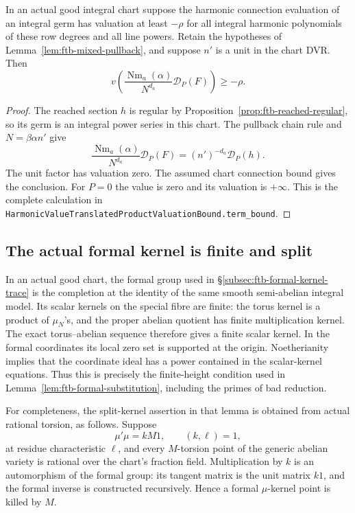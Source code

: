 \begin{srproposition}
\label{prop:ftb-mixed-value-bound}
In an actual good integral chart suppose the harmonic connection
evaluation of an integral germ has valuation at least \(-\rho\) for
all integral harmonic polynomials of these row degrees and all line
powers.
Retain the hypotheses of Lemma~\ref{lem:ftb-mixed-pullback}, and suppose
\(n'\) is a unit in the chart DVR.
Then
\[
 v\left(
  \frac{\operatorname{Nm}_a(\alpha)}{N^{d_a}}
                         \mathcal D_P(F)\right)\ge-\rho .
\]
\end{srproposition}
\begin{proof}
The reached section \(h\) is regular by
Proposition~\ref{prop:ftb-reached-regular}, so its germ is an integral
power series in this chart.
The pullback chain rule and \(N=\beta\alpha n'\) give
\[
 \frac{\operatorname{Nm}_a(\alpha)}{N^{d_a}}\mathcal D_P(F)
             =(n')^{-d_a}\mathcal D_P(h).
\]
The unit factor has valuation zero.
The assumed chart connection bound gives the conclusion.
For \(P=0\) the value is zero and its valuation is \(+\infty\).
This is the complete calculation in
\texttt{HarmonicValueTranslatedProductValuationBound.term\_bound}.
\end{proof}

\subsection{The actual formal kernel is finite and split}
\label{subsec:ftb-actual-split-kernel}

In an actual good chart, the formal group used in
\S\ref{subsec:ftb-formal-kernel-trace} is the completion at the identity
of the same smooth semi-abelian integral model.
Its scalar kernels on the special fibre are finite: the torus kernel
is a product of \(\mu_N\)'s, and the proper abelian quotient has finite
multiplication kernel.
The exact torus--abelian sequence therefore gives a finite scalar
kernel.  In the formal coordinates its local zero set is supported
at the origin.  Noetherianity implies that the coordinate ideal has a
power contained in the scalar-kernel equations.
Thus this is precisely the finite-height condition used in
Lemma~\ref{lem:ftb-formal-substitution}, including the primes of bad
reduction.

For completeness, the split-kernel assertion in that lemma is
obtained from actual rational torsion, as follows.
Suppose
\[
 \mu'\mu=kM1,\qquad (k,\ell)=1,
\]
at residue characteristic \(\ell\), and every \(M\)-torsion point of
the generic abelian variety is rational over the chart's fraction
field.
Multiplication by \(k\) is an automorphism of the formal group:
its tangent matrix is the unit matrix \(k1\), and the formal inverse
is constructed recursively.
Hence a formal \(\mu\)-kernel point is killed by \(M\).

